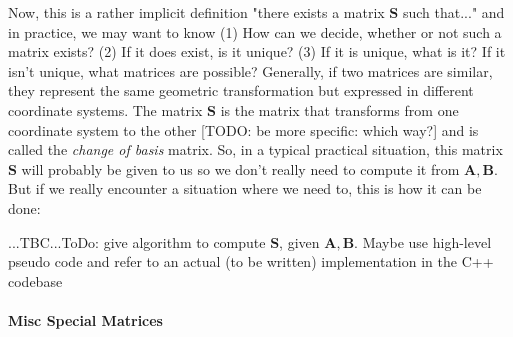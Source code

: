 
\medskip
Now, this is a rather implicit definition "there exists a matrix $\mathbf{S}$ such that..." and in practice, we may want to know (1) How can we decide, whether or not such a matrix exists? (2) If it does exist, is it unique? (3) If it is unique, what is it? If it isn't unique, what matrices are possible? Generally, if two matrices are similar, they represent the same geometric transformation but expressed in different coordinate systems. The matrix $\mathbf{S}$ is the matrix that transforms from one coordinate system to the other [TODO: be more specific: which way?] and is called the \emph{change of basis} matrix. So, in a typical practical situation, this matrix $\mathbf{S}$ will probably be given to us so we don't really need to compute it from $\mathbf{A,B}$. But if we really encounter a situation where we need to, this is how it can be done:

...TBC...ToDo: give algorithm to compute $\mathbf{S}$, given $\mathbf{A,B}$. Maybe use high-level pseudo code and refer to an actual (to be written) implementation in the C++ codebase 







\paragraph{Misc Special Matrices}


